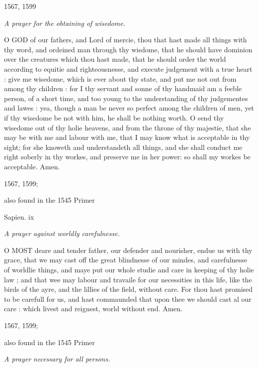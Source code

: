 1567,
1599

\emph{A
prayer for the obtaining of wisedome.}

O
GOD of our fathers, and Lord of mercie, thou that hast made all things
with thy word, and ordeined man through thy wisdome, that he should have
dominion over the creatures which thou hast made, that he should order
the world according to equitie and righteousnesse, and execute judgement
with a true heart : give me wisedome, which is ever about thy state, and
put me not out from among thy children : for I thy servant and sonne of
thy handmaid am a feeble person, of a short time, and too young to the
understanding of thy judgementes and lawes : yea, though a man be never
so perfect among the children of men, yet if thy wisedome be not with
him, he shall be nothing worth. O send thy wisedome out of thy holie heavens,
and from the throne of thy majestie, that she may be with me and labour
with me, that I may know what is acceptable in thy sight; for she knoweth
and understandeth all things, and she shall conduct me right soberly in
thy workes, and preserve me in her power: so shall my workes be acceptable.
Amen.

1567,
1599;

also found in the 1545 Primer

Sapien.
ix

\emph{A
prayer against worldly carefulnesse.}

O
MOST deare and tender father, our defender and nourisher, endue us with
thy grace, that we may cast off the great blindnesse of our mindes, and
carefulnesse of worldlie things, and maye put our whole studie and care
in keeping of thy holie law ; and that wee may labour and travaile for
our necessities in this life, like the birds of the ayre, and the lillies
of the field, without care. For thou hast promised to be carefull for
us, and hast commaunded that upon thee we should cast al our care : which
livest and reignest, world without end. Amen.

1567,
1599;

also found in the 1545 Primer

\emph{A
prayer necessary for all persons.}

